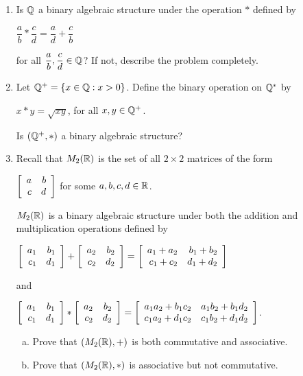 \documentclass[11pt,fleqn,dvipsnames,usenames]{article}
\renewcommand{\headrulewidth}{1pt}
\newcommand{\p}{\noindent}
\begin{document}
\fancyhead[L]{\course}
\fancyhead[R]{\term}
\renewcommand{\headrulewidth}{0.4pt}

\p {\huge \S4.1 Problems}
\vsp

\begin{enumerate}[1.]
\item Is $\Q$ a binary algebraic structure under the operation $*$ defined by
\begin{center}
$\dfrac{a}{b}*\dfrac{c}{d} = \dfrac{a}{d} + \dfrac{c}{b}$
\end{center}
for all $\dfrac{a}{b},\dfrac{c}{d}\in \Q$?    If not, describe the problem completely.
\item Let $\Q^{+} = \SET{x\in\Q:x > 0}$.  Define the binary operation on $\Q^{*}$ by
\begin{center}
$x*y = \sqrt{xy}$, for all $x,y\in\Q^{+}$.
\end{center}
Is $(\Q^{+},*)$ a binary algebraic structure?

\item Recall that $M_{2}(\R)$ is the set of all $2\times 2$ matrices of the form
\begin{center}
$\MATRIX{rr}{a & b\\c& d}$ for some $a,b,c,d\in\R$.
\end{center}
$M_{2}(\R)$ is a binary algebraic structure under both the addition and multiplication operations defined by
\begin{center}
$\MATRIX{rr}{a_{1} & b_{1}\\c_{1} & d_{1}} + \MATRIX{rr}{a_{2} & b_{2}\\c_{2} & d_{2}} = \MATRIX{rr}{a_{1} + a_{2} & b_{1} + b_{2}\\c_{1} + c_{2} & d_{1} + d_{2}}$ 
\end{center}
and 
\begin{center}
$\MATRIX{rr}{a_{1} & b_{1}\\c_{1} & d_{1}} * \MATRIX{rr}{a_{2} & b_{2}\\c_{2} & d_{2}} = \MATRIX{rr}{a_{1}a_{2} + b_{1}c_{2} & a_{1}b_{2} + b_{1}d_{2}\\c_{1}a_{2} + d_{1}c_{2} & c_{1}b_{2} + d_{1}d_{2}}$.
\end{center}
\begin{enumerate}[(a)]
\item Prove that $(M_{2}(\R), +)$ is both commutative and associative.
\item Prove that $(M_{2}(\R), *)$ is associative but not commutative.
\end{enumerate}
\end{enumerate}
\vsp
\end{document}
